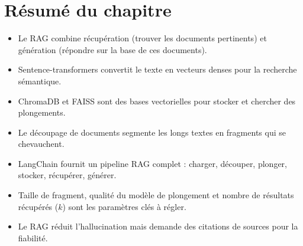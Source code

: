 \section{R\'esum\'e du chapitre}

\begin{itemize}
  \item Le RAG combine r\'ecup\'eration (trouver les documents pertinents) et g\'en\'eration (r\'epondre sur la base de ces documents).
  \item Sentence-transformers convertit le texte en vecteurs denses pour la recherche s\'emantique.
  \item ChromaDB et FAISS sont des bases vectorielles pour stocker et chercher des plongements.
  \item Le d\'ecoupage de documents segmente les longs textes en fragments qui se chevauchent.
  \item LangChain fournit un pipeline RAG complet : charger, d\'ecouper, plonger, stocker, r\'ecup\'erer, g\'en\'erer.
  \item Taille de fragment, qualit\'e du mod\`ele de plongement et nombre de r\'esultats r\'ecup\'er\'es ($k$) sont les param\`etres cl\'es \`a r\'egler.
  \item Le RAG r\'eduit l'hallucination mais demande des citations de sources pour la fiabilit\'e.
\end{itemize}
